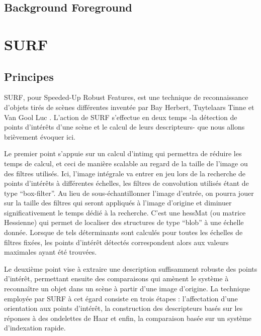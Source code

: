 	\subsection{Background Foreground}
    
      \section{SURF}

	\subsection{Principes}
	
	SURF, pour Speeded-Up Robust Features, est une technique de reconnaissance d'objets tirés de scènes différentes inventée par Bay Herbert, Tuytelaars Tinne et Van Gool Luc \cite{Bib_SURF}.
	L'action de SURF s'effectue en deux temps -la détection de points d'intérêts d'une scène et le calcul de leurs descripteurs-  que nous allons brièvement évoquer ici. 
	
	Le premier point s'appuie sur un calcul d'\gls{intimg} qui permettra de réduire les temps de calcul, et ceci de manière scalable au regard de la taille de l'image ou des filtres utilisés.
	Ici, l'image intégrale va entrer en jeu lors de la recherche de points d'intérêts à différentes échelles, les filtres de convolution utilisés étant de type ``box-filter''. 
	Au lieu de sous-échantillonner l'image d'entrée, on pourra jouer sur la taille des filtres qui seront appliqués à l'image d'origine et diminuer significativement le temps dédié à la recherche.  
	C'est une \gls{hessMat} (ou matrice Hessienne) qui permet de localiser des structures de type ``blob'' à une échelle donnée.
	Lorsque de tels déterminants sont calculés pour toutes les échelles de filtres fixées, les points d'intérêt détectés correspondent alors aux valeurs maximales ayant été trouvées. 
	
	Le deuxième point vise à extraire une description suffisamment robuste des points d'intérêt, permettant ensuite des comparaisons qui amènent le système à reconnaître un objet dans un scène à partir d'une image d'origine.
	La technique employée par SURF à cet égard consiste en trois étapes : 
	l'affectation d'une orientation aux points d'intérêt, la construction des descripteurs basés sur les réponses à des ondelettes de Haar et enfin, la comparaison basée sur un système d'indexation rapide.  
	
